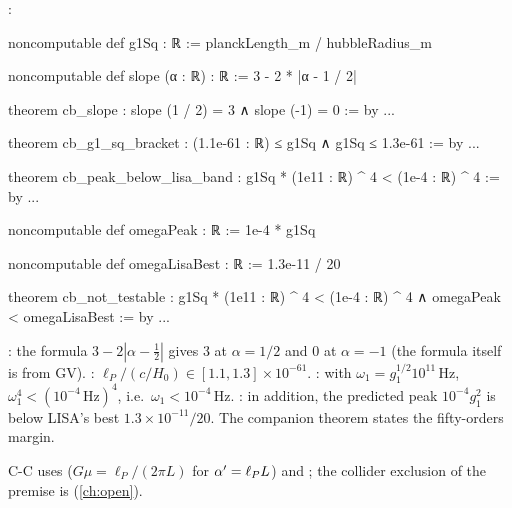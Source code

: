 :
\begin{leancode}
noncomputable def g1Sq : ℝ := planckLength_m / hubbleRadius_m

noncomputable def slope (α : ℝ) : ℝ := 3 - 2 * |α - 1 / 2|

theorem cb_slope : slope (1 / 2) = 3 ∧ slope (-1) = 0 := by ...

theorem cb_g1_sq_bracket : (1.1e-61 : ℝ) ≤ g1Sq ∧ g1Sq ≤ 1.3e-61 := by ...

theorem cb_peak_below_lisa_band :
    g1Sq * (1e11 : ℝ) ^ 4 < (1e-4 : ℝ) ^ 4 := by ...

noncomputable def omegaPeak : ℝ := 1e-4 * g1Sq

noncomputable def omegaLisaBest : ℝ := 1.3e-11 / 20

theorem cb_not_testable :
    g1Sq * (1e11 : ℝ) ^ 4 < (1e-4 : ℝ) ^ 4 ∧ omegaPeak < omegaLisaBest := by ...
\end{leancode}
\begin{leanbox}
: the formula $3-2|\alpha-\tfrac12|$ gives $3$ at $\alpha=1/2$ and $0$ at
$\alpha=-1$ (the formula itself is \TL{} from GV). :
$\ell_P/(c/H_0)\in[1.1,1.3]\times10^{-61}$. : with
$\omega_1=g_1^{1/2}10^{11}$\,Hz, $\omega_1^4<(10^{-4}\,\text{Hz})^4$, i.e.\ $\omega_1<10^{-4}$\,Hz.
: in addition, the predicted peak $10^{-4}g_1^2$ is below LISA's best
$1.3\times10^{-11}/20$. The companion theorem  states the
fifty-orders margin.
\end{leanbox}

\begin{sloppypar}
\noindent C-C uses \allowbreak{}
($G\mu=\ell_P/(2\pi L)$ for $\alpha'=\ell_P L$) and
\allowbreak{}\allowbreak{};
the collider exclusion of the premise is
\allowbreak{}\allowbreak{}
(\cref{ch:open}).
\end{sloppypar}

